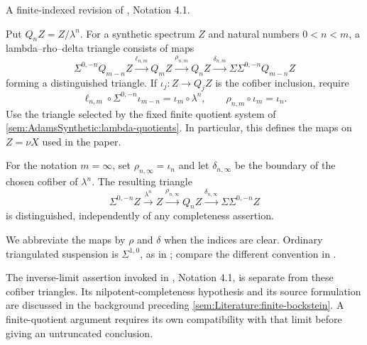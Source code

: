\begin{definition}
\label{notation:AdamsSynthetic:quotient-boundary-maps}
\label{not:deltaandrho}
A finite-indexed revision of \cite{LWX126}, Notation 4.1.

Put $Q_nZ=Z/\lambda^n$. For a synthetic spectrum $Z$ and natural
numbers $0<n<m$, a lambda--rho--delta triangle consists of maps
\[
\Sigma^{0,-n}Q_{m-n}Z\xrightarrow{\ell_{n,m}}Q_mZ
\xrightarrow{\rho_{n,m}}Q_nZ
\xrightarrow{\delta_{n,m}}\Sigma\Sigma^{0,-n}Q_{m-n}Z
\]
forming a distinguished triangle. If $\iota_j:Z\to Q_jZ$ is the
cofiber inclusion, require
\[
\ell_{n,m}\circ\Sigma^{0,-n}\iota_{m-n}
   =\iota_m\circ\lambda^n,
\qquad \rho_{n,m}\circ\iota_m=\iota_n.
\]
Use the triangle selected by the fixed finite quotient system of
\ref{sem:AdamsSynthetic:lambda-quotients}. In particular, this defines
the maps on $Z=\nu X$ used in the paper.

For the notation $m=\infty$, set $\rho_{n,\infty}=\iota_n$ and let
$\delta_{n,\infty}$ be the boundary of the chosen cofiber of
$\lambda^n$. The resulting triangle
\[
\Sigma^{0,-n}Z\xrightarrow{\lambda^n}Z
\xrightarrow{\rho_{n,\infty}}Q_nZ
\xrightarrow{\delta_{n,\infty}}\Sigma\Sigma^{0,-n}Z
\]
is distinguished, independently of any completeness assertion.
\end{definition}

We abbreviate the maps by $\rho$ and $\delta$ when the indices are clear.
Ordinary triangulated suspension is $\Sigma^{1,0}$, as in
\cite[Appendix A]{BHS}; compare the different convention in
\cite[Section 7]{BurklundXu}.

The inverse-limit assertion invoked in \cite{LWX126}, Notation 4.1, is
separate from these cofiber triangles. Its nilpotent-completeness
hypothesis and its source formulation are discussed in the background
preceding \ref{sem:Literature:finite-bockstein}. A finite-quotient argument
requires its own compatibility with that limit before giving an
untruncated conclusion.

